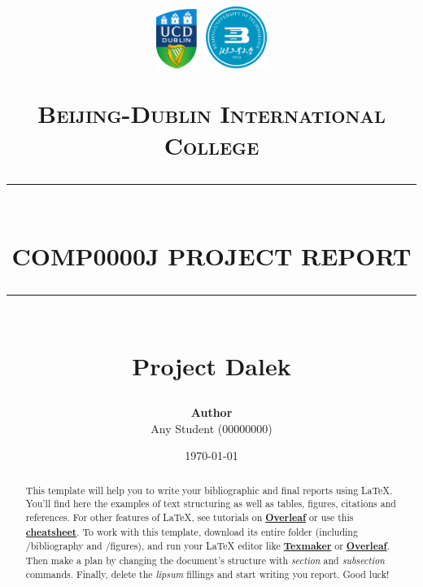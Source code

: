 \documentclass{article}
\newcommand{\HRule}[1]{\rule{\linewidth}{#1}}
\begin{document}





\title{ \normalsize  \includegraphics[width=0.1\textwidth]{images/UCD_Logo.pdf} \textbf{ }
\includegraphics[width=0.15\textwidth]{images/BJUT_Logo.pdf} \par \textsc{Beijing-Dublin International College}
		\\ [2.0cm]
		\HRule{1.5pt} \\ [0.35cm]
		\LARGE \textbf{\uppercase{COMP0000J Project Report}}
		\HRule{1.5pt} \\ [0.9cm] \textbf{\LARGE{Project Dalek}} \vspace*{10\baselineskip}
		}
\date{\today}
\author{\textbf{Author} \\ 
Any Student (00000000) \\
  }

\maketitle
\newpage

\tableofcontents
\newpage


\begin{abstract}
    This template will help you to write your bibliographic and final reports using \LaTeX{}. You'll find here the examples of text structuring as well as tables, figures, citations and references. For other features of \LaTeX, see tutorials on \href{https://www.overleaf.com/learn}{\textbf{Overleaf}} or use this \href{https://wch.github.io/latexsheet/}{\textbf{cheatsheet}}. To work with this template, download its entire folder (including /bibliography and /figures), and run your \LaTeX{}  editor like \href{http://www.xm1math.net/texmaker/}{\textbf{Texmaker}} or \href{https://www.overleaf.com}{\textbf{Overleaf}}. Then make a plan by changing the document's structure with \textit{section} and \textit{subsection} commands. Finally, delete the \textit{lipsum} fillings and start writing you report. Good luck!
\end{abstract}
\end{document}
